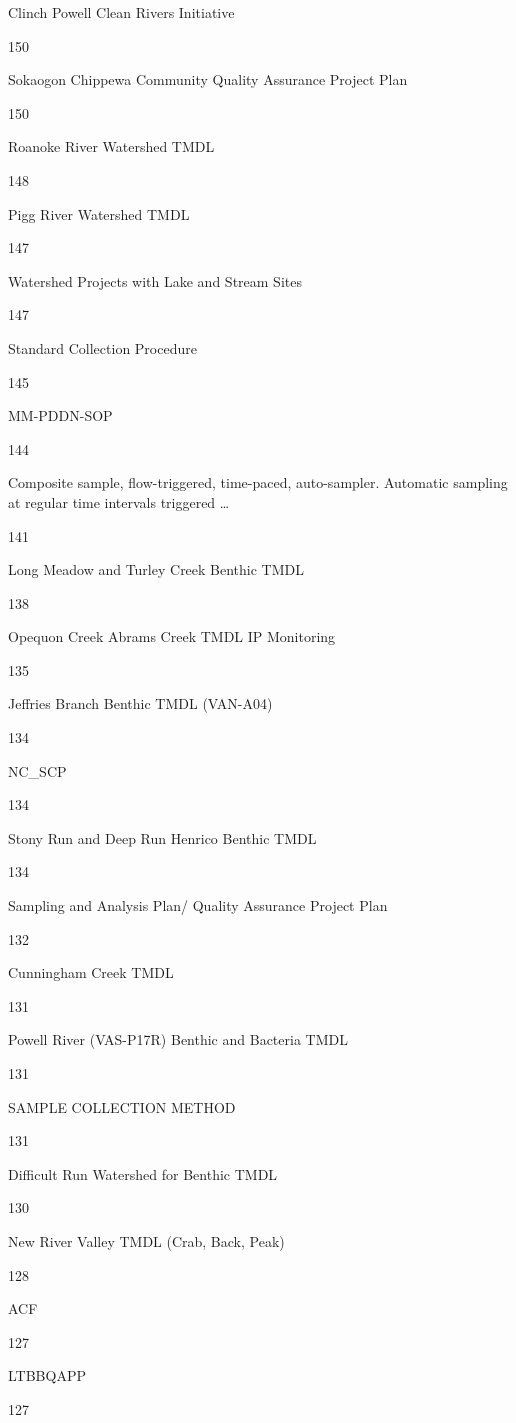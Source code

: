 \documentclass[]{article}
\begin{document}
Clinch Powell Clean Rivers Initiative

150

Sokaogon Chippewa Community Quality Assurance Project Plan

150

Roanoke River Watershed TMDL

148

Pigg River Watershed TMDL

147

Watershed Projects with Lake and Stream Sites

147

Standard Collection Procedure

145

MM-PDDN-SOP

144

Composite sample, flow-triggered, time-paced, auto-sampler. Automatic
sampling at regular time intervals triggered \ldots{}

141

Long Meadow and Turley Creek Benthic TMDL

138

Opequon Creek Abrams Creek TMDL IP Monitoring

135

Jeffries Branch Benthic TMDL (VAN-A04)

134

NC\_SCP

134

Stony Run and Deep Run Henrico Benthic TMDL

134

Sampling and Analysis Plan/ Quality Assurance Project Plan

132

Cunningham Creek TMDL

131

Powell River (VAS-P17R) Benthic and Bacteria TMDL

131

SAMPLE COLLECTION METHOD

131

Difficult Run Watershed for Benthic TMDL

130

New River Valley TMDL (Crab, Back, Peak)

128

ACF

127

LTBBQAPP

127
\end{document}
